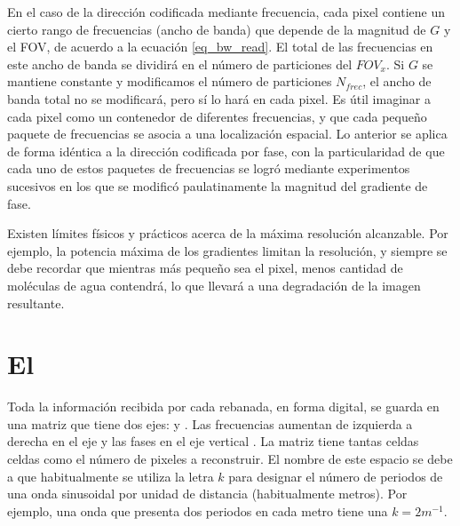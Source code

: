 En el caso de la dirección codificada mediante frecuencia, cada pixel contiene un cierto rango de frecuencias (ancho de banda) que depende de la magnitud de $G$ y el FOV, de acuerdo a la ecuación \ref{eq_bw_read}. El total de las frecuencias en este ancho de banda se dividirá en el número de particiones del $FOV_{x}$. Si $G$ se mantiene constante y modificamos el número de particiones $N_{frec}$, el ancho de banda total no se modificará, pero sí lo hará en cada pixel. Es útil imaginar a cada pixel como un contenedor de diferentes frecuencias, y que cada pequeño paquete de frecuencias se asocia a una localización espacial. Lo anterior se aplica de forma idéntica a la dirección codificada por fase, con la particularidad de que cada uno de estos paquetes de frecuencias se logró mediante experimentos sucesivos en los que se modificó paulatinamente la magnitud del gradiente de fase.


Existen límites físicos y prácticos acerca de la máxima resolución alcanzable. Por ejemplo, la potencia máxima de los gradientes limitan la resolución, y siempre se debe recordar que mientras más pequeño sea el pixel, menos cantidad de moléculas de agua contendrá, lo que llevará a una degradación de la imagen resultante.


\section{El \espaciok}
\label{sec:espaciok}
Toda la información recibida por cada rebanada, en forma digital, se guarda en una matriz que tiene dos ejes: \kx y \ky. Las frecuencias aumentan de izquierda a derecha en el eje \kx y las fases en el eje vertical \ky. La matriz tiene tantas celdas celdas como el número de pixeles a reconstruir.  El nombre de este espacio se debe a que habitualmente se utiliza la letra $k$ para designar el número de periodos de una onda sinusoidal por unidad de distancia (habitualmente metros). Por ejemplo, una onda que presenta dos periodos en cada metro tiene una $k = 2 m^{-1}$.

